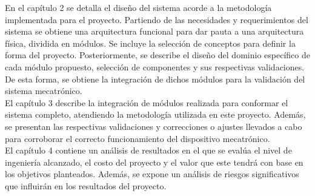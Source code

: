 En el capítulo 2 se detalla el diseño del sistema acorde a la metodología implementada para el proyecto. Partiendo de las necesidades y requerimientos del sistema se obtiene una arquitectura funcional para dar pauta a una arquitectura física, dividida en módulos. Se incluye la selección de conceptos para definir la forma del proyecto. Posteriormente, se describe el diseño del dominio específico de cada módulo propuesto, selección de componentes y sus respectivas validaciones. De esta forma, se obtiene la integración de dichos módulos para la validación del sistema mecatrónico.\\

El capítulo 3 describe la integración de módulos realizada para conformar el sistema completo, atendiendo la metodología utilizada en este proyecto. Además, se presentan las respectivas validaciones y correcciones o ajustes llevados a cabo para corroborar el correcto funcionamiento del dispositivo mecatrónico.\\

El capítulo 4 contiene un análisis de resultados en el que se evalúa el nivel de ingeniería alcanzado, el costo del proyecto y el valor que este tendrá con base en los objetivos planteados. Además, se expone un análisis de riesgos significativos que influirán en los resultados del proyecto.
\endinput 